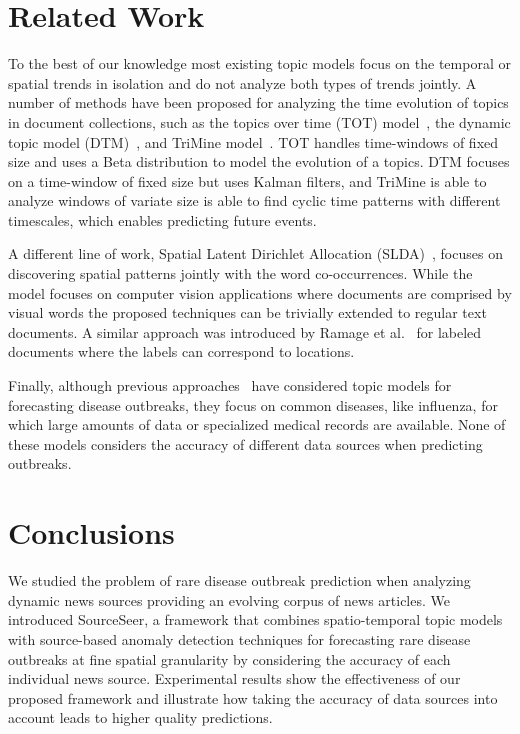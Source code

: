 \documentclass[twoside,leqno,twocolumn]{article}
\newcommand{\fullmodel}{{{\sf SourceSeer}}\xspace}
\begin{document}
%
\section{Related Work}
\label{sec:related_work}
To the best of our knowledge most existing topic models focus on the temporal or spatial trends in isolation and do not analyze both types of trends jointly.  A number of methods have been proposed for analyzing the time evolution of topics in document collections, such as the topics over time (TOT) model~\cite{wang:2006}, the dynamic topic model (DTM)~\cite{blei:2006}, and TriMine model~\cite{matsubara:2012}. TOT handles time-windows of fixed size and uses a Beta distribution to model the evolution of a topics. DTM  focuses on a time-window of fixed size but uses Kalman filters, and TriMine is able to analyze windows of variate size is able to find cyclic time patterns with different timescales, which enables predicting future events.

A different line of work, Spatial Latent Dirichlet Allocation (SLDA)~\cite{wang:2007}, focuses on discovering spatial patterns jointly with the word co-occurrences. While the model focuses on computer vision applications where documents are comprised by visual words the proposed techniques can be trivially extended to regular text documents. A similar approach was introduced by Ramage et al.~\cite{ramage:2009} for labeled documents where the labels can correspond to locations.

Finally, although previous approaches~\cite{paul:11, rider:2013, sadilek:2012} have considered topic models for forecasting disease outbreaks, they focus on common diseases, like influenza, for which large amounts of data or specialized medical records are available. None of these models considers the accuracy of different data sources when predicting outbreaks.

\section{Conclusions}
\label{sec:conclusion}
We studied the problem of rare disease outbreak prediction when analyzing dynamic news sources providing an evolving corpus of news articles. We introduced \fullmodel, a framework that combines spatio-temporal topic models with source-based anomaly detection techniques for forecasting rare disease outbreaks at fine spatial granularity by considering the accuracy of each individual news source. Experimental results show the effectiveness of our proposed framework and illustrate how taking the accuracy of data sources into account leads to higher quality predictions.
\end{document}
